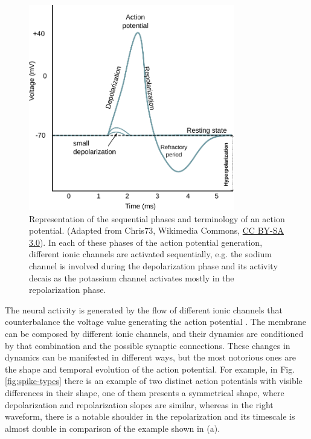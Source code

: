 \begin{figure}[htb!]
    \centering
    \includegraphics[width=0.8\textwidth]{img/intro/action_potential.pdf}
    \caption{Representation of the sequential  phases and terminology of an action potential. (Adapted from Chris73, Wikimedia Commons, \href{https://creativecommons.org/licenses/by-sa/3.0/}{CC BY-SA 3.0}). In each of these phases of the action potential generation, different ionic channels are activated sequentially, e.g. the sodium channel is involved during the depolarization phase and its activity decais as the potassium channel activates mostly in the repolarization phase. }
    \label{fig:action potential}
\end{figure}

The neural activity is generated by the flow of different ionic channels that counterbalance the voltage value generating the action potential \parencite{koch_biophysics_1999}. The membrane can be composed by different ionic channels, and their dynamics are conditioned by that combination and the possible synaptic connections. These changes in dynamics can be manifested in different ways, but the most notorious ones are the shape and temporal evolution of the action potential. %
For example, in Fig. \ref{fig:spike-types} there is an example of two distinct action potentials with visible differences in their shape, one of them presents a symmetrical shape, where depolarization and repolarization slopes are similar, whereas in the right waveform, there is a notable shoulder in the repolarization and its timescale is almost double in comparison of the example shown in (a).

